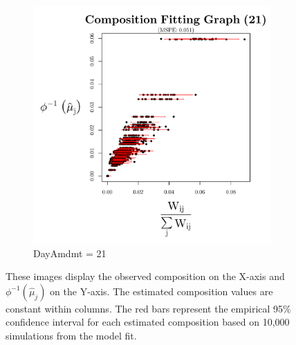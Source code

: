 \documentclass{template}
\begin{document}
\begin{figure}[ht!]
\begin{subfigure}[b]{0.40\textheight}
        \includegraphics[width=\textwidth]{Images/XiaPlotBars21.pdf}
        \caption{DayAmdmt = 21}
    \end{subfigure}
    \caption{These images display the observed composition on the X-axis and $\phi^{-1}(\hat{\mu}_j)$ on the Y-axis. The estimated composition values are constant within columns. The red bars represent the empirical 95\% confidence interval for each estimated composition based on 10,000 simulations from the model fit.}\label{fig:compFitBar}
\end{figure}

\clearpage 
\end{document}
